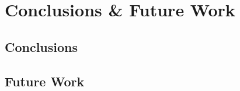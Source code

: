 \chapter{Conclusions \& Future Work}
\label{cha:conclusion}

\section{Conclusions}
\label{sec:conclusions}

\section{Future Work}
\label{sec:future_work}